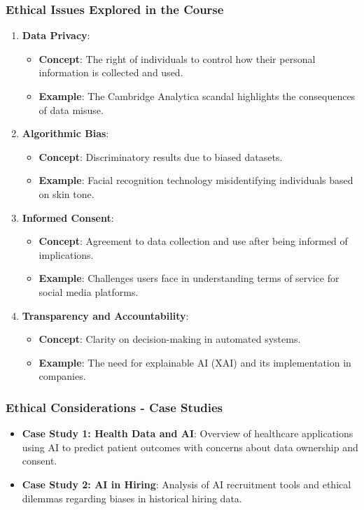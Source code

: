 \documentclass[aspectratio=169]{beamer}
\begin{document}
\begin{frame}[fragile]
    \frametitle{Ethical Issues Explored in the Course}
    \begin{enumerate}
        \item \textbf{Data Privacy}:
            \begin{itemize}
                \item \textbf{Concept}: The right of individuals to control how their personal information is collected and used.
                \item \textbf{Example}: The Cambridge Analytica scandal highlights the consequences of data misuse.
            \end{itemize}

        \item \textbf{Algorithmic Bias}:
            \begin{itemize}
                \item \textbf{Concept}: Discriminatory results due to biased datasets.
                \item \textbf{Example}: Facial recognition technology misidentifying individuals based on skin tone.
            \end{itemize}

        \item \textbf{Informed Consent}:
            \begin{itemize}
                \item \textbf{Concept}: Agreement to data collection and use after being informed of implications.
                \item \textbf{Example}: Challenges users face in understanding terms of service for social media platforms.
            \end{itemize}

        \item \textbf{Transparency and Accountability}:
            \begin{itemize}
                \item \textbf{Concept}: Clarity on decision-making in automated systems.
                \item \textbf{Example}: The need for explainable AI (XAI) and its implementation in companies.
            \end{itemize}
    \end{enumerate}
\end{frame}

\begin{frame}[fragile]
    \frametitle{Ethical Considerations - Case Studies}
    \begin{itemize}
        \item \textbf{Case Study 1: Health Data and AI}: Overview of healthcare applications using AI to predict patient outcomes with concerns about data ownership and consent.
        \item \textbf{Case Study 2: AI in Hiring}: Analysis of AI recruitment tools and ethical dilemmas regarding biases in historical hiring data.
    \end{itemize}
\end{frame}
\end{document}
